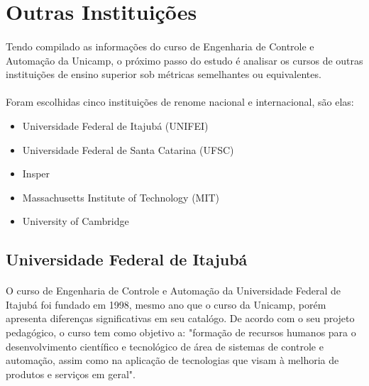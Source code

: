 \documentclass[12pt]{article} %
\begin{document}

\section{Outras Instituições}

\paragraph{} Tendo compilado as informações do curso de Engenharia de Controle e Automação da Unicamp, o próximo passo do estudo é analisar os cursos de outras instituições de ensino superior sob métricas semelhantes ou equivalentes. 

\paragraph{} Foram escolhidas cinco instituições de renome nacional e internacional, são elas:

\begin{itemize}
\item Universidade Federal de Itajubá (UNIFEI)
\item Universidade Federal de Santa Catarina (UFSC)
\item Insper
\item Massachusetts Institute of Technology (MIT)
\item University of Cambridge
\end{itemize}

\subsection{Universidade Federal de Itajubá}

\paragraph{} O curso de Engenharia de Controle e Automação da Universidade Federal de Itajubá foi fundado em 1998, mesmo ano que o curso da Unicamp, porém apresenta diferenças significativas em seu catalógo. De acordo com o seu projeto pedagógico, o curso tem como objetivo a: "formação de recursos humanos para o desenvolvimento científico e tecnológico de área de sistemas de controle e automação, assim como na aplicação de tecnologias que visam à melhoria de produtos e serviços em geral". 
\end{document}
